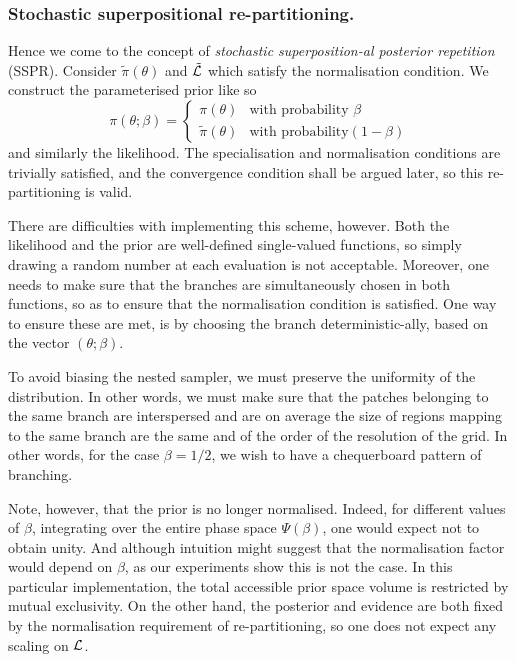 \documentclass[usenatbib]{mnras}
\begin{document}
\subsubsection{Stochastic superpositional re-partitioning.}
\label{sec:org1f972b2}

Hence we come to the concept of \emph{stochastic superposition-al
posterior repetition} (SSPR). Consider \(\tilde{\pi}(\theta)\) and
\({\cal \tilde{L}}\) which satisfy the normalisation
condition. We construct the parameterised prior like so
\begin{equation}
  \pi(\theta; \beta)  = \begin{cases}
	\pi(\theta) & \text{with probability } \beta\\
	\tilde{\pi}(\theta) & \text{with probability} (1- \beta)
	\end{cases}
\end{equation}
and similarly the likelihood.  The specialisation and
normalisation conditions are trivially satisfied, and the
convergence condition shall be argued later, so this
re-partitioning is valid.

There are difficulties with implementing this scheme,
however. Both the likelihood and the prior are well-defined
single-valued functions, so simply drawing a random number at each
evaluation is not acceptable. Moreover, one needs to make sure
that the branches are simultaneously chosen in both functions, so
as to ensure that the normalisation condition is satisfied. One
way to ensure these are met, is by choosing the branch
deterministic-ally, based on the vector \((\theta; \beta)\). 

To avoid biasing the nested sampler, we must preserve the
uniformity of the distribution. In other words, we must make sure
that the patches belonging to the same branch are interspersed and
are on average the size of regions mapping to the same branch are
the same and of the order of the resolution of the grid. In other
words, for the case \(\beta=1/2\), we wish to have a chequerboard
pattern of branching. 

Note, however, that the prior is no longer normalised. Indeed, for
different values of \(\beta\), integrating over the entire phase
space \(\Psi(\beta)\), one would expect not to obtain unity. And
although intuition might suggest that the normalisation factor
would depend on \(\beta\), as our experiments show this is not the
case. In this particular implementation, the total accessible
prior space volume is restricted by mutual exclusivity. On the
other hand, the posterior and evidence are both fixed by the
normalisation requirement of re-partitioning, so one does not
expect any scaling on \({\cal L}\). 
\end{document}
